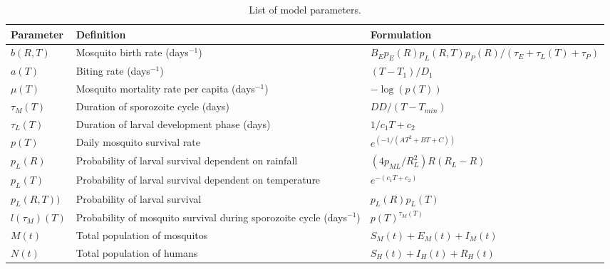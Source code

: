 \documentclass[a4paper,fleqn]{cas-dc}
\begin{document}
\begin{table}[width=2.0\linewidth,cols=3,pos=h]
\caption{List of model parameters.}\label{tbl1}
\renewcommand{\thetable}{Appendix 1}  %
\begin{tabular*}{\tblwidth}{@{} LLL@{} }
\toprule
Parameter & Definition & Formulation\\
\midrule
$b(R, T)$   & Mosquito birth rate (days$^{-1}$)   & ${B_E  p_E(R)  p_L(R,T)  p_P(R)}/{(\tau_E + \tau_L(T) + \tau_P)}$   \\ 
$a(T)$   & Biting rate (days$^{-1}$)  & ${(T - T_1)}/{D_1}$   \\ 
$\mu(T)$   & Mosquito mortality rate per capita (days$^{-1}$)   & $-\log(p(T))$  \\ 
$\tau_M(T)$   & Duration of sporozoite cycle (days)   & ${DD}/{(T - T_{min})}$   \\ 
$\tau_L(T)$   & Duration of larval development phase (days)   & ${1}/{c_1T + c_2}$  \\ 
$p(T)$   & Daily mosquito survival rate   & $e^{(-1 / (AT^2 + BT + C))}$ \\  
$p_L(R)$   & Probability of larval survival dependent on rainfall   & $({4p_{ML}}/{R_L^2})R(R_L - R)$  \\  
$p_L(T)$   & Probability of larval survival dependent on temperature   & $e^{-(c_1T + c_2)}$  \\ 
$p_L(R, T))$   &Probability of larval survival   & $p_L(R)p_L(T)$   \\  
$l({\tau_M})(T)$   &  Probability of mosquito survival during sporozoite cycle (days$^{-1}$)  & $p(T)^{\tau_M(T)}$  \\ 
$M(t)$   &  Total population of mosquitos  & $S_M(t) + E_M(t) + I_M(t)$   \\ 
$N(t)$   & Total population of humans   & $S_H(t) + I_H(t) + R_H(t)$   \\ 
\bottomrule
\end{tabular*}
\end{table}



\printcredits

%





\end{document}
